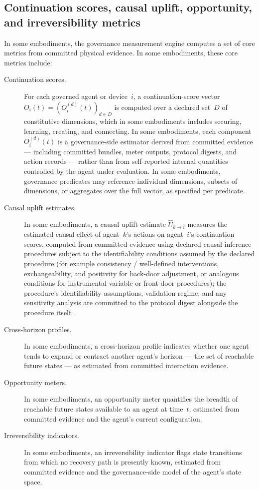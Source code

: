 \documentclass[a4paper,12pt]{article}
\begin{document}
\subsection{Continuation scores, causal uplift, opportunity, and
  irreversibility metrics}
\label{sec:continuation}

In some embodiments, the governance measurement engine computes a set
of core metrics from committed physical evidence. In some embodiments,
these core metrics include:

\begin{description}
  \item[Continuation scores.] For each governed agent or device~$i$,
    a continuation-score vector $O_i(t) = (O_i^{(d)}(t))_{d \in D}$
    is computed over a declared set~$D$ of constitutive dimensions,
    which in some embodiments includes securing, learning, creating,
    and connecting. In some embodiments, each component
    $O_i^{(d)}(t)$ is a governance-side estimator derived from
    committed evidence --- including committed bundles, meter outputs,
    protocol digests, and action records --- rather than from
    self-reported internal quantities controlled by the agent under
    evaluation. In some embodiments, governance predicates may
    reference individual dimensions, subsets of dimensions, or
    aggregates over the full vector, as specified per predicate.
  \item[Causal uplift estimates.] In some embodiments, a causal uplift estimate $\widehat{U}_{k \to i}$ measures the estimated causal effect of agent~$k$'s actions on agent~$i$'s continuation scores, computed from committed evidence using declared causal-inference procedures subject to the identifiability conditions assumed by the declared procedure (for example consistency / well-defined interventions, exchangeability, and positivity for back-door adjustment, or analogous conditions for instrumental-variable or front-door procedures); the procedure's identifiability assumptions, validation regime, and any sensitivity analysis are committed to the protocol digest alongside the procedure itself.
  \item[Cross-horizon profiles.] In some embodiments, a cross-horizon
    profile indicates whether one agent tends to expand or contract
    another agent's horizon --- the set of reachable future states ---
    as estimated from committed interaction evidence.
  \item[Opportunity meters.] In some embodiments, an opportunity meter
    quantifies the breadth of reachable future states available to an
    agent at time~$t$, estimated from committed evidence and the
    agent's current configuration.
  \item[Irreversibility indicators.] In some embodiments, an
    irreversibility indicator flags state transitions from which no
    recovery path is presently known, estimated from committed evidence
    and the governance-side model of the agent's state space.
\end{description}
\end{document}
